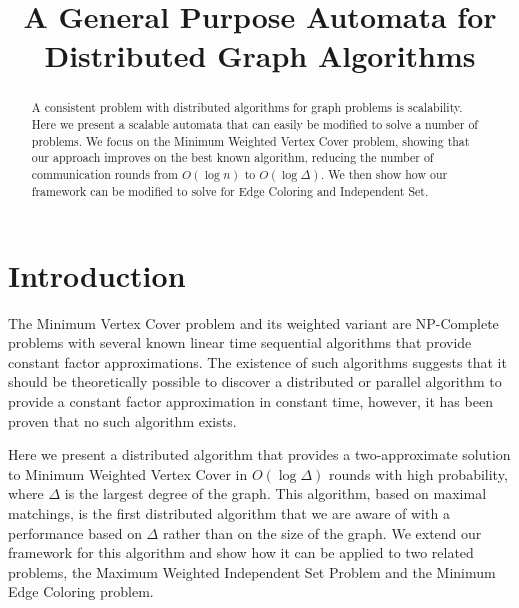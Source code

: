 \documentclass[conference, 10pt, letter]{IEEEtran}
\begin{document}
\title{A General Purpose Automata for Distributed Graph Algorithms}

\author{
}

\maketitle

\begin{abstract}
A consistent problem with distributed algorithms for graph problems is scalability. Here we present a scalable automata that can easily be modified to solve a number of problems. We focus on the Minimum Weighted Vertex Cover problem, showing that our approach improves on the best known algorithm, reducing the number of communication rounds from \( O(\log n) \) to \( O(\log \Delta) \). We then show how our framework can be modified to solve for Edge Coloring and Independent Set.
\end{abstract}

\section{Introduction}


The Minimum Vertex Cover problem and its weighted variant are NP-Complete problems with several known linear time sequential algorithms that provide constant factor approximations. The existence of such algorithms suggests that it should be theoretically possible to discover a distributed or parallel algorithm to provide a constant factor approximation in constant time, however, it has been proven that no such algorithm exists\cite{1011811}. 

Here we present a distributed algorithm that provides a two-approximate solution to Minimum Weighted Vertex Cover in $O(\log\Delta)$ rounds with high probability, where $\Delta$ is the largest degree of the graph. This algorithm, based on maximal matchings, is the first distributed algorithm that we are aware of with a performance based on $\Delta$ rather than on the size of the graph. We extend our framework for this algorithm and show how it can be applied to two related problems, the Maximum Weighted Independent Set Problem and the Minimum Edge Coloring problem.
\end{document}
